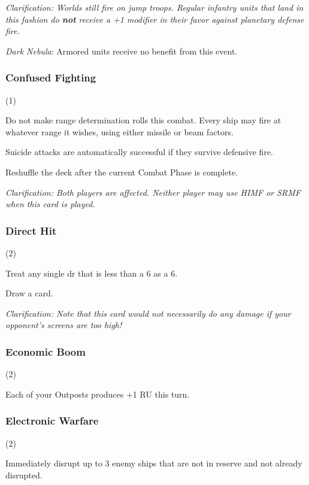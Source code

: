 \documentclass[a4paper,11pt,twocolumn]{article}
\begin{document}
\textit{Clarification: Worlds still fire on jump troops. Regular infantry units that land in this fashion do \textbf{not} receive a +1 modifier in their favor against planetary defense fire.}

\textit{Dark Nebula}: Armored units receive no benefit from this event.

\subsubsection{Confused Fighting} (1)


Do not make range determination rolls this combat. Every ship may fire at whatever range it wishes, using either missile or beam factors.

Suicide attacks are automatically successful if they survive defensive fire.

Reshuffle the deck after the current Combat Phase is complete.

\textit{Clarification: Both players are affected. Neither player may use HIMF or SRMF when this card is played.}

\subsubsection{Direct Hit} (2)


Treat any single dr that is less than a 6 as a 6.

Draw a card.

\textit{Clarification: Note that this card would not necessarily do any damage if your opponent's screens are too high!}

\subsubsection{Economic Boom} (2)


Each of your Outposts produces +1 RU this turn.

\subsubsection{Electronic Warfare} (2)


Immediately disrupt up to 3 enemy ships that are not in reserve and not already disrupted.
\end{document}

